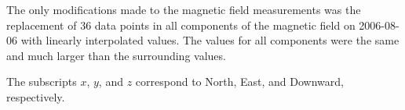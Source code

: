 \documentclass[draft,linenumbers]{agujournal2018}
\begin{document}
The only modifications made to the magnetic field measurements was the replacement of 36 data points in all components of the magnetic field on 2006-08-06 with linearly interpolated values. The values for all components were the same and much larger than the surrounding values.

The subscripts $x$, $y$, and $z$ correspond to North, East, and Downward, respectively.






%
%
%
%
%
%
%
%
\end{document}
